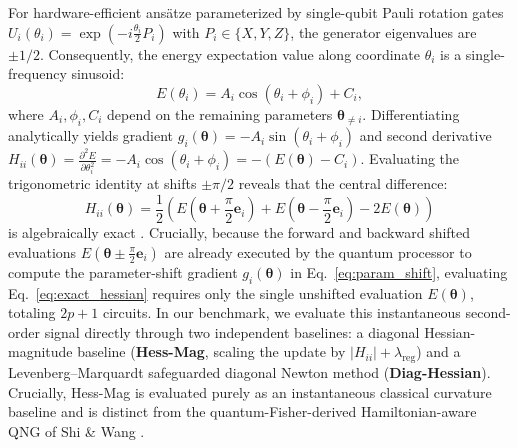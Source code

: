 \documentclass[11pt,a4paper]{article}
\begin{document}
For hardware-efficient ans\"atze parameterized by single-qubit Pauli rotation gates $U_i(\theta_i) = \exp(-i \frac{\theta_i}{2} P_i)$ with $P_i \in \{X, Y, Z\}$, the generator eigenvalues are $\pm 1/2$. Consequently, the energy expectation value along coordinate $\theta_i$ is a single-frequency sinusoid:
\begin{equation}
E(\theta_i) = A_i \cos(\theta_i + \phi_i) + C_i,
\label{eq:sinusoid_form}
\end{equation}
where $A_i, \phi_i, C_i$ depend on the remaining parameters $\boldsymbol{\theta}_{\ne i}$. Differentiating analytically yields gradient $g_i(\boldsymbol{\theta}) = -A_i \sin(\theta_i + \phi_i)$ and second derivative $H_{ii}(\boldsymbol{\theta}) = \frac{\partial^2 E}{\partial \theta_i^2} = -A_i \cos(\theta_i + \phi_i) = -(E(\boldsymbol{\theta}) - C_i)$. Evaluating the trigonometric identity at shifts $\pm \pi/2$ reveals that the central difference:
\begin{equation}
H_{ii}(\boldsymbol{\theta}) = \frac{1}{2}\left(E\left(\boldsymbol{\theta} + \frac{\pi}{2}\mathbf{e}_i\right) + E\left(\boldsymbol{\theta} - \frac{\pi}{2}\mathbf{e}_i\right) - 2E(\boldsymbol{\theta})\right)
\label{eq:exact_hessian}
\end{equation}
is algebraically exact \cite{wierichs2022general}. Crucially, because the forward and backward shifted evaluations $E(\boldsymbol{\theta} \pm \frac{\pi}{2}\mathbf{e}_i)$ are already executed by the quantum processor to compute the parameter-shift gradient $g_i(\boldsymbol{\theta})$ in Eq.~\eqref{eq:param_shift}, evaluating Eq.~\eqref{eq:exact_hessian} requires only the single unshifted evaluation $E(\boldsymbol{\theta})$, totaling $2p+1$ circuits. In our benchmark, we evaluate this instantaneous second-order signal directly through two independent baselines: a diagonal Hessian-magnitude baseline (\textbf{Hess-Mag}, scaling the update by $|H_{ii}| + \lambda_{\text{reg}}$) and a Levenberg--Marquardt safeguarded diagonal Newton method (\textbf{Diag-Hessian}). Crucially, Hess-Mag is evaluated purely as an instantaneous classical curvature baseline and is distinct from the quantum-Fisher-derived Hamiltonian-aware QNG of Shi \& Wang \cite{shi2025hamiltonian}.
\end{document}
